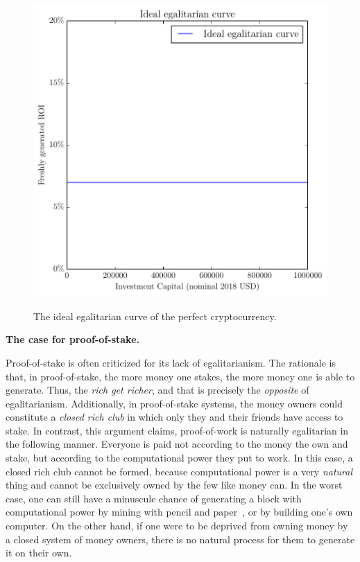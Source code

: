 \begin{figure}[H]
    \caption{The ideal egalitarian curve of the perfect cryptocurrency.}
    \centering
    \includegraphics[width=0.7 \columnwidth,keepaspectratio]{figures/ideal.pdf}
    \label{fig:ideal}
\end{figure}

\noindent
\textbf{The case for proof-of-stake. }

Proof-of-stake is often criticized for its lack of egalitarianism. The rationale
is that, in proof-of-stake, the more money one stakes, the more money one is
able to generate. Thus, the \emph{rich get richer}, and that is precisely the
\emph{opposite} of egalitarianism. Additionally, in proof-of-stake systems, the
money owners could constitute a \emph{closed rich club} in which only they and
their friends have access to stake. In contrast, this argument claims,
proof-of-work is naturally egalitarian in the following manner. Everyone is paid
not according to the money the own and stake, but according to the computational
power they put to work. In this case, a closed rich club cannot be formed,
because computational power is a very \emph{natural} thing and cannot be
exclusively owned by the few like money can. In the worst case, one can still
have a minuscule chance of generating a block with computational power by mining
with pencil and paper~\cite{paper-mining}, or by building one's own computer. On
the other hand, if one were to be deprived from owning money by a closed system
of money owners, there is no natural process for them to generate it on their
own.

